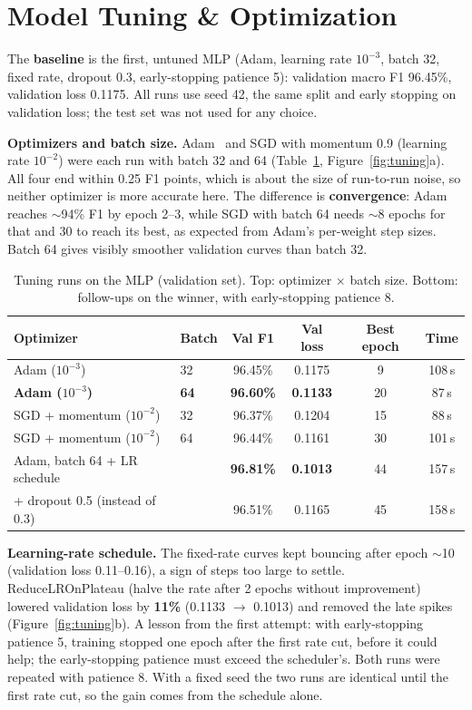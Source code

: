 \documentclass[10pt,a4paper]{article}
\begin{document}
\section{Model Tuning \& Optimization}

The \textbf{baseline} is the first, untuned MLP (Adam, learning rate $10^{-3}$, batch 32, fixed
rate, dropout 0.3, early-stopping patience 5): validation macro F1 96.45\%, validation loss
0.1175. All runs use seed 42, the same split and early stopping on validation loss; the test
set was not used for any choice.

\textbf{Optimizers and batch size.} Adam~\cite{adam} and SGD with momentum 0.9 (learning rate
$10^{-2}$) were each run with batch 32 and 64 (Table~\ref{tab:opt},
Figure~\ref{fig:tuning}a). All four end within 0.25 F1 points, which is about the size of
run-to-run noise, so neither optimizer is more accurate here. The difference is
\textbf{convergence}: Adam reaches $\sim$94\% F1 by epoch 2--3, while SGD with batch 64 needs
$\sim$8 epochs for that and 30 to reach its best, as expected from Adam's per-weight step sizes.
Batch 64 gives visibly smoother validation curves than batch 32.

\begin{table}[ht]
\centering\small
\begin{tabular}{llcccc}
\toprule
Optimizer & Batch & Val F1 & Val loss & Best epoch & Time \\
\midrule
Adam ($10^{-3}$) & 32 & 96.45\% & 0.1175 & 9 & 108\,s \\
\textbf{Adam ($10^{-3}$)} & \textbf{64} & \textbf{96.60\%} & \textbf{0.1133} & 20 & 87\,s \\
SGD + momentum ($10^{-2}$) & 32 & 96.37\% & 0.1204 & 15 & 88\,s \\
SGD + momentum ($10^{-2}$) & 64 & 96.44\% & 0.1161 & 30 & 101\,s \\
\midrule
Adam, batch 64 + LR schedule & & \textbf{96.81\%} & \textbf{0.1013} & 44 & 157\,s \\
\quad + dropout 0.5 (instead of 0.3) & & 96.51\% & 0.1165 & 45 & 158\,s \\
\bottomrule
\end{tabular}
\caption{Tuning runs on the MLP (validation set). Top: optimizer $\times$ batch size. Bottom:
follow-ups on the winner, with early-stopping patience 8.}
\label{tab:opt}
\end{table}

\textbf{Learning-rate schedule.} The fixed-rate curves kept bouncing after epoch $\sim$10
(validation loss 0.11--0.16), a sign of steps too large to settle. ReduceLROnPlateau (halve the
rate after 2 epochs without improvement) lowered validation loss by \textbf{11\%}
(0.1133 $\rightarrow$ 0.1013) and removed the late spikes (Figure~\ref{fig:tuning}b). A lesson
from the first attempt: with early-stopping patience 5, training stopped one epoch after the
first rate cut, before it could help; the early-stopping patience must exceed the scheduler's.
Both runs were repeated with patience 8. With a fixed seed the two runs are identical until the
first rate cut, so the gain comes from the schedule alone.
\end{document}

